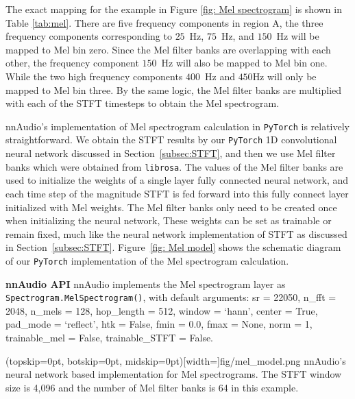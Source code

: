\documentclass{ieeeaccess}
\newcommand{\nbh}[1]{\texttt{#1}}
\begin{document}
The exact mapping for the example in Figure \ref{fig: Mel spectrogram} is shown in Table \ref{tab:mel}. There are five frequency components in region A, the three frequency components corresponding to $25$~Hz, $75$~Hz, and $150$~Hz will be mapped to Mel bin zero. Since the Mel filter banks are overlapping with each other, the frequency component $150$~Hz will also be mapped to Mel bin one. While the two high frequency components $400$~Hz and $450$Hz will only be mapped to Mel bin three. By the same logic, the Mel filter banks are multiplied with each of the STFT timesteps to obtain the Mel spectrogram.


nnAudio's implementation of Mel spectrogram calculation in \nbh{PyTorch} is relatively straightforward. We obtain the STFT results by our \nbh{PyTorch} 1D convolutional neural network discussed in Section~\ref{subsec:STFT}, and then we use Mel filter banks which were obtained from \nbh{librosa}. The values of the Mel filter banks are used to initialize the weights of a single layer fully connected neural network, and each time step of the magnitude STFT is fed forward into this fully connect layer initialized with Mel weights.  The Mel filter banks only need to be created once when initializing the neural network, These weights can be set as trainable or remain fixed,  much like the neural network implementation of STFT as discussed in Section~\ref{subsec:STFT}. Figure~\ref{fig: Mel model} shows the schematic diagram of our \nbh{PyTorch} implementation of the Mel spectrogram calculation.

\hspace{11pt} 

\noindent \textbf{nnAudio API} nnAudio implements the Mel spectrogram layer as \nbh{Spectrogram.MelSpectrogram()}, with default arguments: sr = 22050, n\_fft = 2048, n\_mels = 128, hop\_length = 512, window = `hann', center = True, pad\_mode = `reflect', htk = False, fmin = 0.0, fmax = None, norm = 1, trainable\_mel = False, trainable\_STFT = False.

\Figure[t](topskip=0pt, botskip=0pt, midskip=0pt)[width=\linewidth]{fig/mel_model.png}
{nnAudio's neural network based implementation for Mel spectrograms. The STFT window size is 4,096 and the number of Mel filter banks is 64 in this example.} \label{fig: Mel model}
\end{document}

